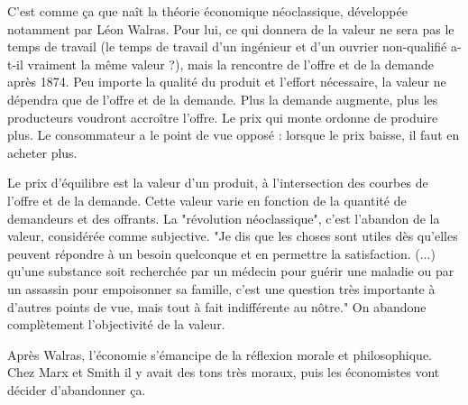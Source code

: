 \documentclass[a4paper,12pt]{book}
\begin{document}
\par C'est comme ça que naît la théorie économique néoclassique, développée notamment par Léon Walras. Pour lui, ce qui donnera de la valeur ne sera pas le temps de travail (le temps de travail d'un ingénieur et d'un ouvrier non-qualifié a-t-il vraiment la même valeur ?), mais la rencontre de l'offre et de la demande après 1874. Peu importe la qualité du produit et l'effort nécessaire, la valeur ne dépendra que de l'offre et de la demande. Plus la demande augmente, plus les producteurs voudront accroître l'offre. Le prix qui monte ordonne de produire plus. Le consommateur a le point de vue opposé : lorsque le prix baisse, il faut en acheter plus.
\par Le prix d'équilibre est la valeur d'un produit, à l'intersection des courbes de l'offre et de la demande. Cette valeur varie en fonction de la quantité de demandeurs et des offrants. La "révolution néoclassique", c'est l'abandon de la valeur, considérée comme subjective. "Je dis que les choses sont utiles dès qu'elles peuvent répondre à un besoin quelconque et en permettre la satisfaction. (...) qu'une substance soit recherchée par un médecin pour guérir une maladie ou par un assassin pour empoisonner sa famille, c'est une question très importante à d'autres points de vue, mais tout à fait indifférente au nôtre." On abandone complètement l'objectivité de la valeur.
\par Après Walras, l'économie s'émancipe de la réflexion morale et philosophique. Chez Marx et Smith il y avait des tons très moraux, puis les économistes vont décider d'abandonner ça.
\end{document}

